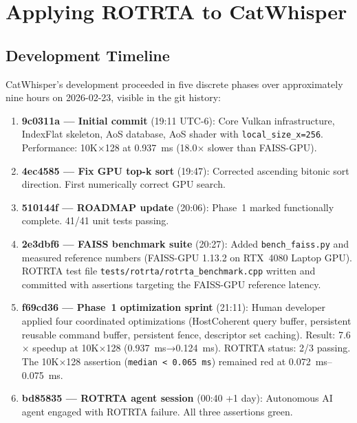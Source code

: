 \documentclass[conference]{IEEEtran}
\begin{document}
\section{Applying ROTRTA to CatWhisper}
\label{sec:application}

\subsection{Development Timeline}

CatWhisper's development proceeded in five discrete phases over
approximately nine hours on 2026-02-23, visible in the git history:

\begin{enumerate}
  \item \textbf{9c0311a — Initial commit} (19:11 UTC-6): Core Vulkan
        infrastructure, IndexFlat skeleton, AoS database, AoS shader with
        \texttt{local\_size\_x=256}.  Performance: 10K×128 at
        \SI{0.937}{\ms} (18.0$\times$ slower than FAISS-GPU).

  \item \textbf{4ec4585 — Fix GPU top-k sort} (19:47): Corrected ascending
        bitonic sort direction.  First numerically correct GPU search.

  \item \textbf{510144f — ROADMAP update} (20:06): Phase~1 marked
        functionally complete.  41/41 unit tests passing.

  \item \textbf{2e3dbf6 — FAISS benchmark suite} (20:27): Added
        \texttt{bench\_faiss.py} and measured reference numbers (FAISS-GPU
        1.13.2 on RTX~4080 Laptop GPU).  ROTRTA test file
        \texttt{tests/rotrta/rotrta\_benchmark.cpp} written and committed
        with assertions targeting the FAISS-GPU reference latency.

  \item \textbf{f69cd36 — Phase~1 optimization sprint} (21:11): Human
        developer applied four coordinated optimizations (HostCoherent query
        buffer, persistent reusable command buffer, persistent fence,
        descriptor set caching).  Result: 7.6$\times$ speedup at 10K×128
        (\SI{0.937}{\ms}→\SI{0.124}{\ms}).  ROTRTA status: 2/3 passing.
        The 10K×128 assertion (\texttt{median < 0.065\,ms}) remained red at
        \SI{0.072}{\ms}--\SI{0.075}{\ms}.

  \item \textbf{bd85835 — ROTRTA agent session} (00:40 +1 day): Autonomous
        AI agent engaged with ROTRTA failure.  All three assertions green.
\end{enumerate}
\end{document}
